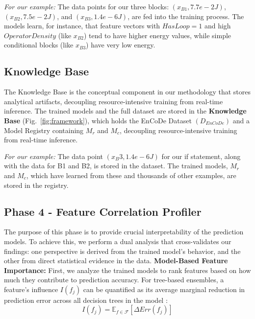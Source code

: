 \noindent
\textit{For our example:} The data points for our three blocks: \((x_{B1}, 7.7e-2 J)\), \((x_{B2}, 7.5e-2 J)\), and \((x_{B3}, 1.4e-6 J)\), are fed into the training process. The models learn, for instance, that feature vectors with \(HasLoop=1\) and high \(OperatorDensity\) (like \(x_{B2}\)) tend to have higher energy values, while simple conditional blocks (like \(x_{B3}\)) have very low energy.

\subsection{Knowledge Base}
\noindent
The Knowledge Base is the conceptual component in our methodology that stores analytical artifacts, decoupling resource-intensive training from real-time inference.
\noindent
The trained models and the full dataset are stored in the \textbf{Knowledge Base} (Fig.~\ref{fig:framework}), which holds the EnCoDe Dataset \((D_{EnCoDe})\) and a Model Registry containing \(M_r\) and \(M_c\), decoupling resource-intensive training from real-time inference.

\noindent
\textit{For our example:} The data point \((x_B3, 1.4e-6 J)\) for our if statement, along with the data for B1 and B2, is stored in the dataset. The trained models, \(M_r\) and \(M_c\), which have learned from these and thousands of other examples, are stored in the registry.

\subsection{Phase 4 - Feature Correlation Profiler}
\noindent
The purpose of this phase is to provide crucial interpretability of the prediction models.
\noindent
To achieve this, we perform a dual analysis that cross-validates our findings: one perspective is derived from the trained model's behavior, and the other from direct statistical evidence in the data.
\noindent
\textbf{Model-Based Feature Importance:} First, we analyze the trained models to rank features based on how much they contribute to prediction accuracy. For tree-based ensembles, a feature's influence \(I(f_j)\) can be quantified as its average marginal reduction in prediction error across all decision trees in the model :
\[ I(f_j) = \mathbb{E}_{f \in \mathcal{F}}[\Delta Err(f_j)] \]

